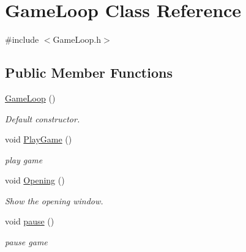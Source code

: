 \hypertarget{class_game_loop}{}\section{Game\+Loop Class Reference}
\label{class_game_loop}


{\ttfamily \#include $<$Game\+Loop.\+h$>$}

\subsection*{Public Member Functions}
\begin{DoxyCompactItemize}
\item 
\mbox{\label{class_game_loop_a1b3a349263c8c243400c8cc8fe718655}} 
\mbox{\hyperlink{class_game_loop_a1b3a349263c8c243400c8cc8fe718655}{Game\+Loop}} ()
\begin{DoxyCompactList}\small\item\em Default constructor. \end{DoxyCompactList}\item 
\mbox{\label{class_game_loop_a17a913e989badbbe10581834ca40f308}} 
void \mbox{\hyperlink{class_game_loop_a17a913e989badbbe10581834ca40f308}{Play\+Game}} ()
\begin{DoxyCompactList}\small\item\em play game \end{DoxyCompactList}\item 
\mbox{\label{class_game_loop_ac7bd478c2fa92d6bc8d493f0c7b43189}} 
void \mbox{\hyperlink{class_game_loop_ac7bd478c2fa92d6bc8d493f0c7b43189}{Opening}} ()
\begin{DoxyCompactList}\small\item\em Show the opening window. \end{DoxyCompactList}\item 
\mbox{\label{class_game_loop_a313059f0bc129f869de8059ce822ddfb}} 
void \mbox{\hyperlink{class_game_loop_a313059f0bc129f869de8059ce822ddfb}{pause}} ()
\begin{DoxyCompactList}\small\item\em pause game \end{DoxyCompactList}\item 
\mbox{\label{class_game_loop_a3afbb7d2141730850d4ef637f314d4d9}} 

\end{DoxyCompactItemize}
